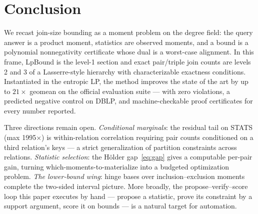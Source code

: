 \section{Conclusion}
\label{sec:conclusion}

We recast join-size bounding as a moment problem on the degree field:
the query answer is a product moment, statistics are observed moments,
and a bound is a polynomial nonnegativity certificate whose dual is a
worst-case alignment.  In this frame, LpBound is the level-1 section
and exact pair/triple join counts are levels 2 and 3 of a Lasserre-style
hierarchy with characterizable exactness conditions.  Instantiated in
the entropic LP, the method improves the state of the art by up to
$21\times$ geomean on the official evaluation suite --- with zero
violations, a predicted negative control on DBLP, and machine-checkable
proof certificates for every number reported.

Three directions remain open.  \emph{Conditional marginals}: the
residual tail on STATS (max 1995$\times$) is within-relation
correlation requiring pair counts conditioned on a third relation's
keys --- a strict generalization of partition constraints across
relations.  \emph{Statistic selection}: the H\"older
gap~\eqref{eq:gap} gives a computable per-pair gain, turning
which-moments-to-materialize into a budgeted optimization problem.
\emph{The lower-bound wing}: hinge bases over inclusion--exclusion
moments complete the two-sided interval picture.  More broadly, the
propose--verify--score loop this paper executes by hand --- propose a
statistic, prove its constraint by a support argument, score it on
bounds --- is a natural target for automation.
